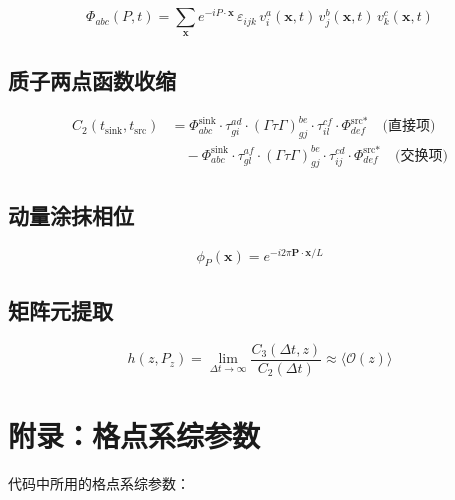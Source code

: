 \documentclass[12pt,a4paper]{ctexart}
\begin{document}
\begin{equation}
\Phi_{abc}(P, t) = \sum_{\mathbf{x}} e^{-iP\cdot\mathbf{x}} \, \varepsilon_{ijk} \, v_i^a(\mathbf{x}, t) \, v_j^b(\mathbf{x}, t) \, v_k^c(\mathbf{x}, t)
\end{equation}

\subsection{质子两点函数收缩}

\begin{align}
C_2(t_{\text{sink}}, t_{\text{src}}) &= \Phi_{abc}^{\text{sink}} \cdot \tau_{gi}^{ad} \cdot (\Gamma\tau\Gamma)_{gj}^{be} \cdot \tau_{il}^{cf} \cdot \Phi_{def}^{\text{src}*} \quad \text{(直接项)} \\
&\quad - \Phi_{abc}^{\text{sink}} \cdot \tau_{gl}^{af} \cdot (\Gamma\tau\Gamma)_{gj}^{be} \cdot \tau_{ij}^{cd} \cdot \Phi_{def}^{\text{src}*} \quad \text{(交换项)}
\end{align}

\subsection{动量涂抹相位}

\begin{equation}
\phi_P(\mathbf{x}) = e^{-i 2\pi \mathbf{P}\cdot\mathbf{x} / L}
\end{equation}

\subsection{矩阵元提取}

\begin{equation}
h(z, P_z) = \lim_{\Delta t \to \infty} \frac{C_3(\Delta t, z)}{C_2(\Delta t)} \approx \langle \mathcal{O}(z) \rangle
\end{equation}

\section{附录：格点系综参数}
\label{sec:ensemble}

代码中所用的格点系综参数：
\end{document}
